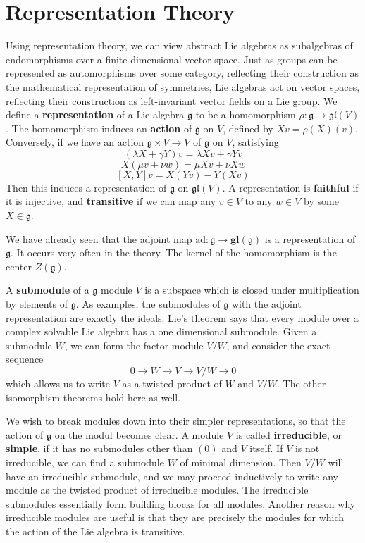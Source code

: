 \chapter{Representation Theory}

Using representation theory, we can view abstract Lie algebras as subalgebras of endomorphisms over a finite dimensional vector space. Just as groups can be represented as automorphisms over some category, reflecting their construction as the mathematical representation of symmetries, Lie algebras act on vector spaces, reflecting their construction as left-invariant vector fields on a Lie group. We define a {\bf representation} of a Lie algebra $\mathfrak{g}$ to be a homomorphism $\rho: \mathfrak{g} \to \mathfrak{gl}(V)$. The homomorphism induces an {\bf action} of $\mathfrak{g}$ on $V$, defined by $Xv = \rho(X)(v)$. Conversely, if we have an action $\mathfrak{g} \times V \to V$ of $\mathfrak{g}$ on $V$, satisfying
%
\[ (\lambda X + \gamma Y)v = \lambda Xv + \gamma Yv \]
\[ X(\mu v + \nu w) = \mu Xv + \nu Xw \]
\[ [X,Y] v = X(Yv) - Y(Xv) \]
%
Then this induces a representation of $\mathfrak{g}$ on $\mathfrak{gl}(V)$. A representation is {\bf faithful} if it is injective, and {\bf transitive} if we can map any $v \in V$ to any $w \in V$ by some $X \in \mathfrak{g}$.

\begin{example}
    We have already seen that the adjoint map $\text{ad}: \mathfrak{g} \to \mathbf{gl}(\mathfrak{g})$ is a representation of $\mathfrak{g}$. It occurs very often in the theory. The kernel of the homomorphism is the center $Z(\mathfrak{g})$.
\end{example}

A {\bf submodule} of a $\mathfrak{g}$ module $V$ is a subspace which is closed under multiplication by elements of $\mathfrak{g}$. As examples, the submodules of $\mathfrak{g}$ with the adjoint representation are exactly the ideals. Lie's theorem says that every module over a complex solvable Lie algebra has a one dimensional submodule. Given a submodule $W$, we can form the factor module $V/W$, and consider the exact sequence
%
\[ 0 \to W \to V \to V/W \to 0 \]
%
which allows us to write $V$ as a twisted product of $W$ and $V/W$. The other isomorphism theorems hold here as well.

We wish to break modules down into their simpler representations, so that the action of $\mathfrak{g}$ on the modul becomes clear. A module $V$ is called {\bf irreducible}, or {\bf simple}, if it has no submodules other than $(0)$ and $V$ itself. If $V$ is not irreducible, we can find a submodule $W$ of minimal dimension. Then $V/W$ will have an irreducible submodule, and we may proceed inductively to write any module as the twisted product of irreducible modules. The irreducible submodules essentially form building blocks for all modules. Another reason why irreducible modules are useful is that they are precisely the modules for which the action of the Lie algebra is transitive.

